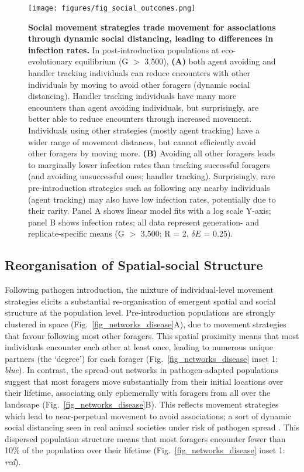 \begin{figure}[!h]
    \centering
    \texttt{[image: figures/fig\_social\_outcomes.png]}
    \caption{
        \textbf{Social movement strategies trade movement for associations through dynamic social distancing, leading to differences in infection rates.}
        In post-introduction populations at eco-evolutionary equilibrium (G $>$ 3,500), \textbf{(A)} both agent avoiding and handler tracking individuals can reduce encounters with other individuals by moving to avoid other foragers (dynamic social distancing).
        Handler tracking individuals have many more encounters than agent avoiding individuals, but surprisingly, are better able to reduce encounters through increased movement.
        Individuals using other strategies (mostly agent tracking) have a wider range of movement distances, but cannot efficiently avoid other foragers by moving more.
        \textbf{(B)} Avoiding all other foragers leads to marginally lower infection rates than tracking successful foragers (and avoiding unsuccessful ones; handler tracking).
        Surprisingly, rare pre-introduction strategies such as following any nearby individuals (agent tracking) may also have low infection rates, potentially due to their rarity.
        Panel A shows linear model fits with a log scale Y-axis; panel B shows infection rates; all data represent generation- and replicate-specific means (G $>$ 3,500; R = 2, $\delta E$ = 0.25).
    }\label{fig_social_outcomes}
\end{figure}

\subsection*{Reorganisation of Spatial-social Structure}

Following pathogen introduction, the mixture of individual-level movement strategies elicits a substantial re-organisation of emergent spatial and social structure at the population level.
Pre-introduction populations are strongly clustered in space (Fig.~\ref{fig_networks_disease}A), due to movement strategies that favour following most other foragers.
This spatial proximity means that most individuals encounter each other at least once, leading to numerous unique partners (the `degree') for each forager (Fig.~\ref{fig_networks_disease} inset 1: \emph{blue}).
In contrast, the spread-out networks in pathogen-adapted populations suggest that most foragers move substantially from their initial locations over their lifetime, associating only ephemerally with foragers from all over the landscape (Fig.~\ref{fig_networks_disease}B).
This reflects movement strategies which lead to near-perpetual movement to avoid associations; a sort of dynamic social distancing seen in real animal societies under risk of pathogen spread \autocite{weinstein2018,stroeymeyt2018,pusceddu2021,stockmaier2021}.
This dispersed population structure means that most foragers encounter fewer than 10\% of the population over their lifetime (Fig.~\ref{fig_networks_disease} inset 1: \emph{red}).

